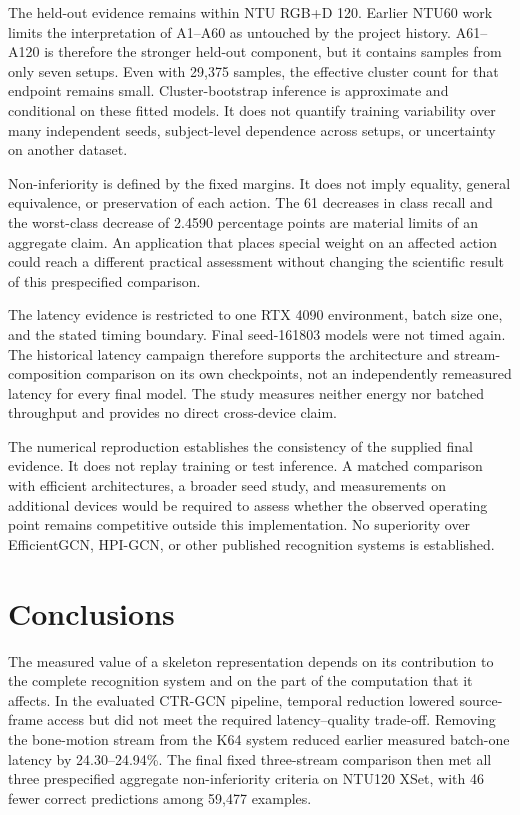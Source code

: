 \documentclass[ai,article,submit,moreauthors]{Definitions/mdpi}
\begin{document}
The held-out evidence remains within NTU RGB+D 120. Earlier NTU60 work
limits the interpretation of A1--A60 as untouched by the project history.
A61--A120 is therefore the stronger held-out component, but it contains
samples from only seven setups. Even with 29,375 samples, the effective
cluster count for that endpoint remains small. Cluster-bootstrap inference
is approximate and conditional on these fitted models. It does not quantify
training variability over many independent seeds, subject-level dependence
across setups, or uncertainty on another dataset.

Non-inferiority is defined by the fixed margins. It does not imply equality, general
equivalence, or preservation of each action. The 61 decreases in class recall
and the worst-class decrease of 2.4590 percentage points are material limits
of an aggregate claim. An application that places special weight on an
affected action could reach a different practical assessment without changing
the scientific result of this prespecified comparison.

The latency evidence is restricted to one RTX 4090 environment, batch size
one, and the stated timing boundary. Final seed-161803 models were not timed
again. The historical latency campaign therefore supports the architecture
and stream-composition comparison on its own checkpoints, not an independently
remeasured latency for every final model. The study measures neither energy
nor batched throughput and provides no direct cross-device claim.

The numerical reproduction establishes the consistency of the supplied final evidence. It does not replay training or test inference. A matched comparison with efficient architectures, a broader seed study, and measurements on additional devices would be required to assess whether the observed operating point remains competitive outside this implementation. No superiority over EfficientGCN, HPI-GCN, or other published recognition systems is established.

\section{Conclusions}
The measured value of a skeleton representation depends on its contribution to the complete recognition system and on the part of the computation that it affects. In the evaluated CTR-GCN pipeline, temporal reduction lowered source-frame access but did not meet the required latency--quality trade-off. Removing the bone-motion stream from the K64 system reduced earlier measured batch-one latency by 24.30--24.94\%. The final fixed three-stream comparison then met all three prespecified aggregate non-inferiority criteria on NTU120 XSet, with 46 fewer correct predictions among 59,477 examples.
\end{document}

